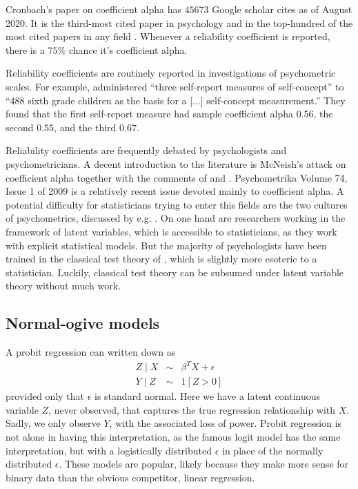 Cronbach's \citeyear{Cronbach1951-in} paper on coefficient alpha has $45673$ Google scholar cites as of August 2020. It is the third-most cited paper in psychology and in the top-hundred of the most cited papers in any field \parencite{McNeish2018-vu}. Whenever a reliability coefficient is reported, there is a $75\%$ chance it's coefficient alpha.

Reliability coefficients are routinely reported in investigations of psychometric scales. For example, \textcite{Marx1978-rf} administered \enquote{three self-report measures of self-concept} to \enquote{488 sixth grade children as the basis for a [...] self-concept measurement.} They found that the first self-report measure had sample coefficient alpha $0.56$, the second $0.55$, and the third $0.67$. 

Reliability coefficients are frequently debated by psychologists and psychometricians. A decent introduction to the literature is McNeish's \citeyear{McNeish2018-vu} attack on coefficient alpha together with the comments of \textcite{Raykov2019-yr} and \textcite{Savalei2019-se}. Psychometrika Volume 74, Issue 1 of 2009 is a relatively recent issue devoted mainly to coefficient alpha. A potential difficulty for statisticians trying to enter this fields are the two cultures of psychometrics, discussed by e.g. \textcite{Borsboom2005-iq}. On one hand are researchers working in the framework of latent variables, which is accessible to statisticians, as they work with explicit statistical models. But the majority of psychologists have been trained in the classical test theory of \textcite{Lord1968-ax}, which is slightly more esoteric to a statistician. Luckily, classical test theory can be subsumed under latent variable theory without much work.

\subsection{Normal-ogive models}
\label{subsec:Normal-ogive models}

A probit regression can written down as
\begin{eqnarray*}
Z\mid X & \sim & \beta^{T}X+\epsilon\\
Y\mid Z & \sim & 1[Z>0]
\end{eqnarray*}
provided only that $\epsilon$ is standard normal. Here we have a latent continuous variable $Z$, never observed, that captures the true regression relationship with $X$. Sadly, we only observe $Y$, with the associated loss of power. Probit regression is not alone in having this interpretation, as the famous logit model has the same interpretation, but with a logistically distributed $\epsilon$ in place of the normally distributed $\epsilon$. These models are popular, likely because they make more sense for binary data than the obvious competitor, linear regression.

